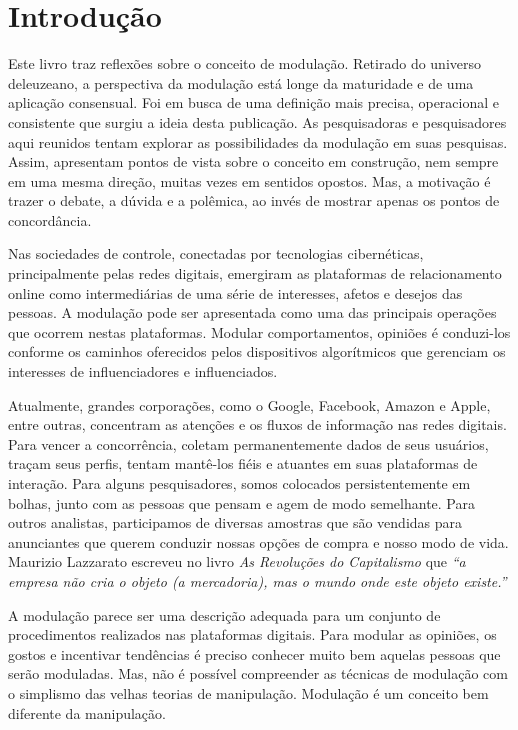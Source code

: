 \section{Introdução}

Este livro traz reflexões sobre o conceito de modulação. Retirado do
universo deleuzeano, a perspectiva da modulação está longe da maturidade
e de uma aplicação consensual. Foi em busca de uma definição mais
precisa, operacional e consistente que surgiu a ideia desta publicação.
As pesquisadoras e pesquisadores aqui reunidos tentam explorar as
possibilidades da modulação em suas pesquisas. Assim, apresentam pontos
de vista sobre o conceito em construção, nem sempre em uma mesma
direção, muitas vezes em sentidos opostos. Mas, a motivação é trazer o
debate, a dúvida e a polêmica, ao invés de mostrar apenas os pontos de
concordância.

Nas sociedades de controle, conectadas por tecnologias cibernéticas,
principalmente pelas redes digitais, emergiram as plataformas de
relacionamento online como intermediárias de uma série de interesses,
afetos e desejos das pessoas. A modulação pode ser apresentada como uma
das principais operações que ocorrem nestas plataformas. Modular
comportamentos, opiniões é conduzi-los conforme os caminhos oferecidos
pelos dispositivos algorítmicos que gerenciam os interesses de
influenciadores e influenciados.

Atualmente, grandes corporações, como o Google, Facebook, Amazon e
Apple, entre outras, concentram as atenções e os fluxos de informação
nas redes digitais. Para vencer a concorrência, coletam permanentemente
dados de seus usuários, traçam seus perfis, tentam mantê-los fiéis e
atuantes em suas plataformas de interação. Para alguns pesquisadores,
somos colocados persistentemente em bolhas, junto com as pessoas que
pensam e agem de modo semelhante. Para outros analistas, participamos de
diversas amostras que são vendidas para anunciantes que querem conduzir
nossas opções de compra e nosso modo de vida. Maurizio Lazzarato
escreveu no livro \emph{As Revoluções do Capitalismo} que \emph{``a
empresa não cria o objeto (a mercadoria), mas o mundo onde este objeto
existe.''}

A modulação parece ser uma descrição adequada para um conjunto de
procedimentos realizados nas plataformas digitais. Para modular as
opiniões, os gostos e incentivar tendências é preciso conhecer muito bem
aquelas pessoas que serão moduladas. Mas, não é possível compreender as
técnicas de modulação com o simplismo das velhas teorias de manipulação.
Modulação é um conceito bem diferente da manipulação.

